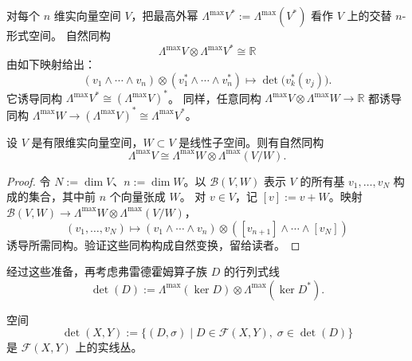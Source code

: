 对每个 $n$ 维实向量空间 $V$，把最高外幂
$\Lambda^{\max}V^*:=\Lambda^{\max}(V^*)$ 看作 $V$ 上的交替 $n$-形式空间。
自然同构
\[
  \Lambda^{\max}V\otimes\Lambda^{\max}V^*\cong\mathbb R
\]
由如下映射给出：
\[
  (v_1\wedge\cdots\wedge v_n)
  \otimes(v_1^*\wedge\cdots\wedge v_n^*)
  \longmapsto\det\bigl(v_k^*(v_j)\bigr).
\]
它诱导同构
$\Lambda^{\max}V^*\cong(\Lambda^{\max}V)^*$。
同样，任意同构 $\Lambda^{\max}V\otimes\Lambda^{\max}W\to\mathbb R$
都诱导同构 $\Lambda^{\max}W\to(\Lambda^{\max}V)^*
\cong\Lambda^{\max}V^*$。

\begin{lemma}\label{lem:A-2-1}
设 $V$ 是有限维实向量空间，$W\subset V$ 是线性子空间。则有自然同构
\[
  \Lambda^{\max}V\cong\Lambda^{\max}W\otimes\Lambda^{\max}(V/W).
\]
\end{lemma}

\begin{proof}
令 $N:=\dim V$、$n:=\dim W$。以 $\mathcal B(V,W)$ 表示 $V$ 的所有基
$v_1,\ldots,v_N$ 构成的集合，其中前 $n$ 个向量张成 $W$。
对 $v\in V$，记 $[v]:=v+W$。映射
$\mathcal B(V,W)\to\Lambda^{\max}W\otimes\Lambda^{\max}(V/W)$，
\[
  (v_1,\ldots,v_N)\longmapsto
  (v_1\wedge\cdots\wedge v_n)
  \otimes([v_{n+1}]\wedge\cdots\wedge[v_N])
\]
诱导所需同构。验证这些同构构成自然变换，留给读者。
\end{proof}

经过这些准备，再考虑弗雷德霍姆算子族 $D$ 的行列式线
\[
  \det(D):=\Lambda^{\max}(\ker D)\otimes\Lambda^{\max}(\ker D^*).
\]

\begin{theorem}\label{thm:A-2-2}
空间
\[
  \det(X,Y):=\bigl\{(D,\sigma)\mid D\in\mathcal F(X,Y),\;
  \sigma\in\det(D)\bigr\}
\]
是 $\mathcal F(X,Y)$ 上的实线丛。
\end{theorem}

